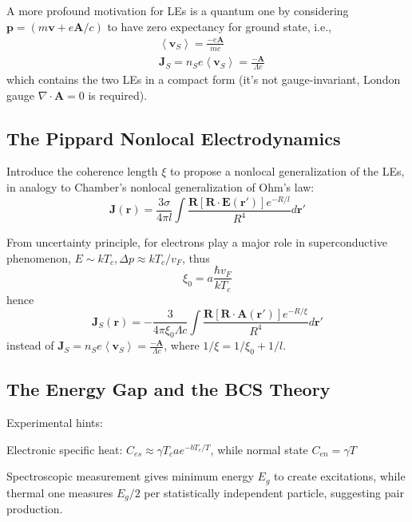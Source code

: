 \documentclass[8pt,a4paper,twocolumn]{article} %
\numberwithin{equation}{section} %
\begin{document}
			A more profound motivation for LEs is a quantum one by considering $\bm p = (m \bm v+e \bm A/c)$ to have zero expectancy for ground state, i.e.,
			\begin{align}
				&\left< \bm v_S \right>=\frac{-e \bm A}{mc}\\
				&\bm J_S = n_S e\left< \bm v_S \right>=\frac{-\bm A}{\Lambda c}
			\end{align}
			which contains the two LEs in a compact form (it's not gauge-invariant, London gauge $ \nabla\cdot\bm A=0 $ is required).

		\subsection{The Pippard Nonlocal Electrodynamics} %
		\label{sub:the_pipard_nonlocal_electrodynamics}
			Introduce the coherence length $ \xi $ to propose a nonlocal generalization of the LEs, in analogy to Chamber's nonlocal generalization of Ohm's law:
			\begin{equation*}
				\bm J(\bm r)=\frac{3 \sigma}{4 \pi l}\int \frac{\bm R[\bm R\cdot \bm E (\bm r')] e^{-R/l}}{R^4}d\bm r'
			\end{equation*}

			From uncertainty principle, for electrons play a major role in superconductive phenomenon, $E\sim kT_c, \Delta p\approx kT_c/v_F$, thus
			\begin{equation}
				\xi_0 = a \frac{\hbar v_F}{kT_c}
			\end{equation}
			hence
			\begin{equation}
				\bm J_S(\bm r)=-\frac{3 }{4 \pi \xi_0 \Lambda c}\int \frac{\bm R[\bm R\cdot \bm A (\bm r')] e^{-R/\xi}}{R^4}d\bm r'
			\end{equation}
			instead of $ \bm J_S = n_S e\left< \bm v_S \right>=\frac{-\bm A}{\Lambda c} $, where $ 1/\xi = 1/\xi_0 + 1/l $.

		\subsection{The Energy Gap and the BCS Theory} %
		\label{sub:the_energy_gap_and_the_bcs_theory}
			Experimental hints:

			Electronic specific heat: $C_{es}\approx \gamma T_c a e^{-bT_c/T} $, while normal state $C_{en}=\gamma T $

			Spectroscopic measurement gives minimum energy $E_g$ to create excitations, while thermal one measures $E_g/2$ per statistically independent particle, suggesting pair production.
\end{document}

